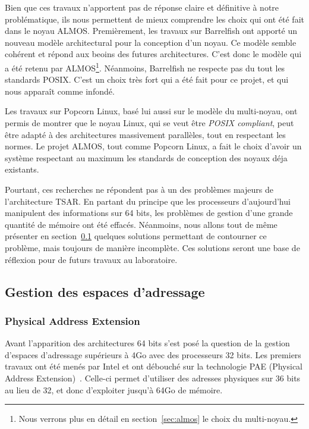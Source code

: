      Bien que ces travaux n'apportent pas de réponse claire et définitive à
      notre problématique, ils nous permettent de mieux comprendre les choix qui
      ont été fait dans le noyau ALMOS. Premièrement, les travaux sur Barrelfish
      ont apporté un nouveau modèle architectural pour la conception d'un
      noyau. Ce modèle semble cohérent et répond aux beoins des futures
      architectures. C'est donc le modèle qui a été retenu par
      ALMOS\footnote{Nous verrons plus en détail en section~\ref{sec:almos} le
        choix du multi-noyau.}. Néanmoins, Barrelfish ne respecte pas du tout
      les standards POSIX. C'est un choix très fort qui a été fait pour ce
      projet, et qui nous apparaît comme infondé.

      Les travaux sur Popcorn Linux, basé lui aussi sur le modèle du
      multi-noyau, ont permis de montrer que le noyau Linux, qui se veut être
      \textit{POSIX compliant}, peut être adapté à des architectures massivement
      parallèles, tout en respectant les normes. Le projet ALMOS, tout comme
      Popcorn Linux, a fait le choix d'avoir un système respectant au maximum
      les standards de conception des noyaux déja existants.

      Pourtant, ces recherches ne répondent pas à un des problèmes majeurs de
      l'architecture TSAR. En partant du principe que les processeurs
      d'aujourd'hui manipulent des informations sur 64 bits, les problèmes de
      gestion d'une grande quantité de mémoire ont été effacés. Néanmoins, nous
      allons tout de même présenter en section~\ref{sec:memory} quelques
      solutions permettant de contourner ce problème, mais toujours de manière
      incomplète. Ces solutions seront une base de réflexion pour de futurs
      travaux au laboratoire.
    
     

  \subsection{Gestion des espaces d'adressage}
  \label{sec:memory}    

    \subsubsection{Physical Address Extension}

      Avant l'apparition des architectures 64 bits s'est posé la question de la
      gestion d'espaces d'adressage supérieurs à 4Go avec des processeurs 32
      bits. Les premiers travaux ont été menés par Intel et ont débouché sur la
      technologie PAE (Physical Address
      Extension)~\citep{patent6349380}. Celle-ci permet d'utiliser des adresses
      physiques sur 36 bits au lieu de 32, et donc d'exploiter jusqu'à 64Go de
      mémoire.

